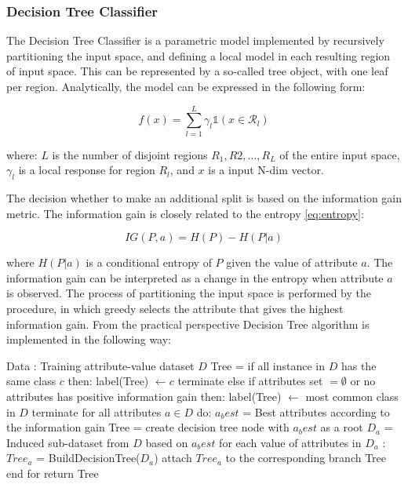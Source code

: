 \subsubsection{Decision Tree Classifier}
\label{sec:Decision_Trees}
The Decision Tree Classifier is a parametric model implemented by recursively partitioning the input space, and defining a local model in each resulting region of input space. This can be represented by a so-called tree object, with one leaf per region. 
Analytically, the model can be expressed in the following form: 

\begin{equation}
    f(x) = \sum^{L}_{l=1} \gamma_l \mathds{1}(x \in \mathcal{R}_{l})
\end{equation}

where: $L$ is the number of disjoint regions $R_{1},R{2}, \ldots, R_{L}$ of the entire input space, $\gamma_l$ is a local response for region $R_l$, and $x$ is a input N-dim vector.  

The decision whether to make an additional split is based on the information gain metric. The information gain is closely related to the entropy \ref{eq:entropy}: 

\begin{equation}
    IG(P,a) = H(P) - H(P|a)
\end{equation}

where $ H(P|a)$ is a conditional entropy of $P$ given the value of attribute $a$. The information gain can be interpreted as a change in the entropy when attribute $a$ is observed. The process of partitioning the input space is performed by the procedure, in which greedy selects the attribute that gives the highest information gain. 
From the practical perspective Decision Tree algorithm is implemented in the following way: 



\begin{algorithm}[caption={Building Decision Tree (psudocode)}, label={DTAlgorithm}]
Data : Training attribute-value dataset $D$
Tree = {}
if all instance in $D$ has the same class $c$ then:
   label(Tree) $\leftarrow c$ 
   terminate
else if attributes set $= \emptyset$ or no attributes has positive information gain then:
   label(Tree) $\leftarrow $ most common class in $D$
   terminate
for all attributes $a \in D$ do:
   $a_best$ = Best attributes according to the information gain
   Tree = create decision tree node with $a_best$ as a root
   $D_a$ = Induced sub-dataset from $D$ based on $a_best$
   for each value of attributes in $D_a$ :
      $Tree_{a}$ = BuildDecisionTree($D_a$)
      attach  $Tree_{a}$  to the corresponding branch Tree
end for
return Tree
\end{algorithm}

